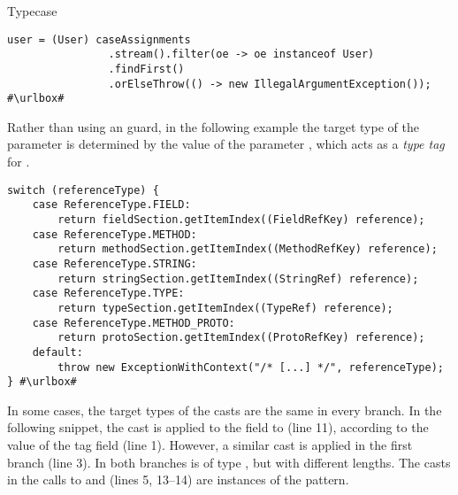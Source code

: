 \begin{pattern}{Typecase}
\def\urlvar{http://bit.ly/kiegroup_jbpm_2ENCL8a}
\begin{verbatim}
user = (User) caseAssignments
                .stream().filter(oe -> oe instanceof User)
                .findFirst()
                .orElseThrow(() -> new IllegalArgumentException());
#\urlbox#
\end{verbatim}

Rather than using an  guard, in the following example
the target type of the parameter  is determined by the value
of the parameter ,
which acts as a \emph{type tag} for .

\def\urlvar{http://bit.ly/JesusFreke_smali_2Ho8bVL}
\begin{verbatim}
switch (referenceType) {
    case ReferenceType.FIELD:
        return fieldSection.getItemIndex((FieldRefKey) reference);
    case ReferenceType.METHOD:
        return methodSection.getItemIndex((MethodRefKey) reference);
    case ReferenceType.STRING:
        return stringSection.getItemIndex((StringRef) reference);
    case ReferenceType.TYPE:
        return typeSection.getItemIndex((TypeRef) reference);
    case ReferenceType.METHOD_PROTO:
        return protoSection.getItemIndex((ProtoRefKey) reference);
    default:
        throw new ExceptionWithContext("/* [...] */", referenceType);
} #\urlbox#
\end{verbatim}

In some cases, the target types of the casts are the same in every branch.
In the following snippet,
the cast is applied to the  field to (line 11),
according to the value of the tag  field (line 1).
However, a similar cast is applied in the first branch (line 3).
In both branches  is of type ,
but with different lengths.
The casts in the calls to  and
 (lines 5, 13--14)
are instances of the  pattern.


\end{pattern}
